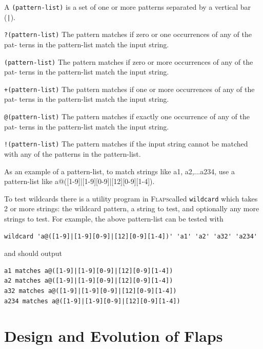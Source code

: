 \documentclass[11pt,openany,twoside]{book}
\numberwithin{equation}{section}		%
\newcommand{\Code}[1]{{\small\tt #1}}
\newcommand{\Flaps}{\textsc{Flaps\:}}
\begin{document}
A \Code{(pattern-list)} is a set of one or more patterns separated by
a vertical bar (\verb+|+).

	\begin{description}
       \item{\Code{?(pattern-list)}}
              The pattern matches if zero or one occurrences of any of  the  pat‐
              terns in the pattern-list match the input string.

       \item{\Code{*(pattern-list)}}
              The  pattern matches if zero or more occurrences of any of the pat‐
              terns in the pattern-list match the input string.

       \item{\Code{+(pattern-list)}}
              The pattern matches if one or more occurrences of any of  the  pat‐
              terns in the pattern-list match the input string.

       \item{\Code{@(pattern-list)}}
              The  pattern  matches  if exactly one occurrence of any of the pat‐
              terns in the pattern-list match the input string.

       \item{\Code{!(pattern-list)}}
              The pattern matches if the input string cannot be matched with  any
              of the patterns in the pattern-list.
	\end{description}
As an example of a pattern-list, to match strings like a1, a2,...a234,
use a pattern-list like a@([1-9]|[1-9][0-9]|[12][0-9][1-4]).

To test wildcards there is a utility program in \Flaps called \Code{wildcard}
which takes 2 or more strings: the wildcard pattern, a string to test,
and optionally any more strings to test. For example, the above pattern-list
can be tested with
\begin{lstlisting}
wildcard 'a@([1-9]|[1-9][0-9]|[12][0-9][1-4])' 'a1' 'a2' 'a32' 'a234'
\end{lstlisting}
and should output
\begin{lstlisting}
a1 matches a@([1-9]|[1-9][0-9]|[12][0-9][1-4])
a2 matches a@([1-9]|[1-9][0-9]|[12][0-9][1-4])
a32 matches a@([1-9]|[1-9][0-9]|[12][0-9][1-4])
a234 matches a@([1-9]|[1-9][0-9]|[12][0-9][1-4])
\end{lstlisting}
	
\newpage
\section{Design and Evolution of Flaps}\label{sect:design}
\end{document}
